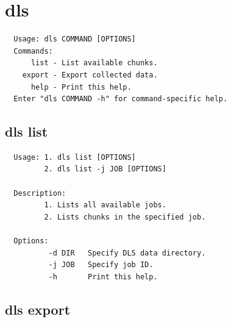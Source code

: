 \documentclass[a4paper,12pt,BCOR6mm,bibtotoc,idxtotoc]{scrbook}
\begin{document}
\section{dls}
\label{sec:apx_cmd_dls}

\begin{lstlisting}
  Usage: dls COMMAND [OPTIONS]
  Commands:
      list - List available chunks.
    export - Export collected data.
      help - Print this help.
  Enter "dls COMMAND -h" for command-specific help.
\end{lstlisting}


\subsection{dls list}

\begin{lstlisting}
  Usage: 1. dls list [OPTIONS]
         2. dls list -j JOB [OPTIONS]

  Description:
         1. Lists all available jobs.
         2. Lists chunks in the specified job.

  Options:
          -d DIR   Specify DLS data directory.
          -j JOB   Specify job ID.
          -h       Print this help.
\end{lstlisting}


\subsection{dls export}
\end{document}
